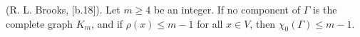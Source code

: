 (R. L. Brooks, [b.18]). Let $m \geq 4$ be an integer. If no component of $\Gamma$ is the complete graph $K_m$, and if $\rho(x) \leq m - 1$ for all $x \in V$, then $\chi_0(\Gamma) \leq m - 1$.
